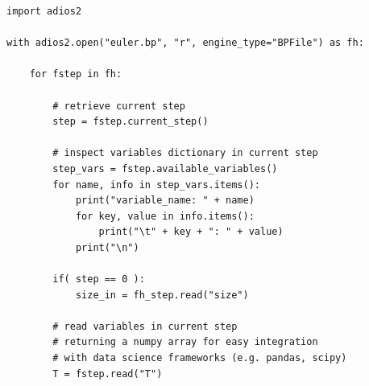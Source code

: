 \documentclass[x11names,table,xcdraw,graybox]{svmult}
\begin{document}


\begin{minipage}{\linewidth}
\begin{lstlisting}[frame=single,label={pythonAPI},caption={Python High-Level API Read Example}]
import adios2

with adios2.open("euler.bp", "r", engine_type="BPFile") as fh:

    for fstep in fh:

        # retrieve current step
        step = fstep.current_step()

        # inspect variables dictionary in current step
        step_vars = fstep.available_variables()
        for name, info in step_vars.items():
            print("variable_name: " + name)
            for key, value in info.items():
                print("\t" + key + ": " + value)
            print("\n")

        if( step == 0 ):
            size_in = fh_step.read("size")

        # read variables in current step
        # returning a numpy array for easy integration
        # with data science frameworks (e.g. pandas, scipy)
        T = fstep.read("T")

\end{lstlisting}
\end{minipage}
\end{document}

